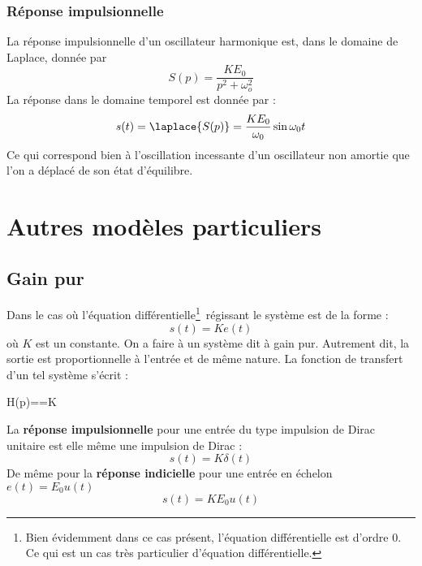 \subsubsection{Réponse impulsionnelle}
La réponse impulsionnelle d'un oscillateur harmonique est, dans le domaine 
de Laplace, donnée par 
\[
S(p)=\dfrac{KE_0}{p^2+\omega_o^2}
\]
La réponse dans le domaine temporel est donnée par :
\[
s(t)=\laplace{S(p)}=\dfrac{KE_0}{\omega_0}\sin{\omega_0t}
\]
Ce qui correspond bien à l'oscillation incessante d'un oscillateur non amortie
que l'on a déplacé de son état d'équilibre.
\section{Autres modèles particuliers}
\subsection{Gain pur}
Dans le cas où l'équation différentielle\footnote{Bien évidemment 
dans ce cas présent, l'équation différentielle est d'ordre 0. Ce qui est 
un cas très particulier d'équation différentielle.}~régissant le système 
est de la forme :
\[
s(t)=Ke(t)
\]
où $K$ est un constante. On a faire à un système dit à gain pur. 
Autrement dit, la sortie est proportionnelle à l'entrée et de même nature.
La fonction de transfert d'un tel système s'écrit :
\begin{bequation}
    H(p)==K
\end{bequation}
La \textbf{réponse impulsionnelle} pour une entrée du type impulsion de 
Dirac unitaire est elle même une impulsion de Dirac :
\[
s(t)=K\delta(t)
\]
De même pour la \textbf{réponse indicielle} pour une entrée en 
échelon $e(t)=E_0u(t)$
\[
s(t)=KE_0u(t)
\]
